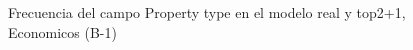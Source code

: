 \begin{figure}[H]
    \centering
    
    \caption{Frecuencia del campo Property type en el modelo real y top2+1, Economicos (B-1)}
    \label{frecuency-Property Type-top2+1}
\end{figure}